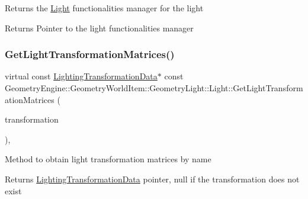 Returns the \mbox{\hyperlink{class_geometry_engine_1_1_geometry_world_item_1_1_geometry_light_1_1_light}{Light}} functionalities manager for the light \begin{DoxyReturn}{Returns}
Pointer to the light functionalities manager 
\end{DoxyReturn}
\mbox{\label{class_geometry_engine_1_1_geometry_world_item_1_1_geometry_light_1_1_light_a332c999d4f704855683e079d99b563b2}} 
\subsubsection{\texorpdfstring{GetLightTransformationMatrices()}{GetLightTransformationMatrices()}}
{\footnotesize\ttfamily virtual const \mbox{\hyperlink{class_geometry_engine_1_1_lighting_transformation_data}{Lighting\+Transformation\+Data}}$\ast$ const Geometry\+Engine\+::\+Geometry\+World\+Item\+::\+Geometry\+Light\+::\+Light\+::\+Get\+Light\+Transformation\+Matrices (\begin{DoxyParamCaption}\item[{Light\+Transformation\+Matrices}]{transformation }\end{DoxyParamCaption})\hspace{0.3cm}{\ttfamily [inline]}, {\ttfamily [virtual]}}

Method to obtain light transformation matrices by name \begin{DoxyReturn}{Returns}
\mbox{\hyperlink{class_geometry_engine_1_1_lighting_transformation_data}{Lighting\+Transformation\+Data}} pointer, null if the transformation does not exist 
\end{DoxyReturn}
\mbox{\label{class_geometry_engine_1_1_geometry_world_item_1_1_geometry_light_1_1_light_a108d5b6143e4c55113f7656224f9799f}} 
